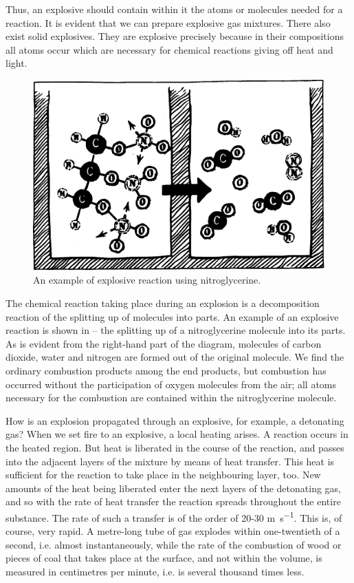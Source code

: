Thus, an explosive should contain within it the atoms or molecules needed for a reaction. It is evident that we can prepare explosive gas mixtures. There also exist solid explosives. They are explosive precisely because in their compositions all atoms occur which are necessary for chemical reactions giving off heat and light.
\begin{figure}[!ht]
\centering
\includegraphics[width=\textwidth]{figures/fig-07-03.pdf}
\caption{An example of explosive reaction using nitroglycerine.}
\label{fig-7.3}
\end{figure}

The chemical reaction taking place during an explosion is a decomposition reaction of the splitting up of mole­cules into parts. An example of an explosive reaction is shown in  -- the splitting up of a nitroglycerine molecule into its parts. As is evident from the right-hand part of the diagram, molecules of carbon dioxide, water and nitrogen are formed out of the original molecule. We find the ordinary combustion products among the end products, but combustion has occurred without the par­ticipation of oxygen molecules from the air; all atoms necessary for the combustion are contained within the nitroglycerine molecule.

How is an explosion propagated through an explosive, for example, a detonating gas? When we set fire to an explosive, a local heating arises. A reaction occurs in the heated region. But heat is liberated in the course of the reaction, and passes into the adjacent layers of the mixture by means of heat transfer. This heat is sufficient for the reaction to take place in the neighbouring layer, too. New amounts of the heat being liberated enter the next layers of the detonating gas, and so with the rate of heat transfer the reaction spreads throughout the entire substance. The rate of such a transfer is of the order of 20-30 \si{\meter\per\second}. This is, of course, very rapid. A metre-long tube of gas explodes within one-twentieth of a second, i.e. almost instantaneously, while the rate of the combus­tion of wood or pieces of coal that takes place at the sur­face, and not within the volume, is measured in centime­tres per minute, i.e. is several thousand times less.


